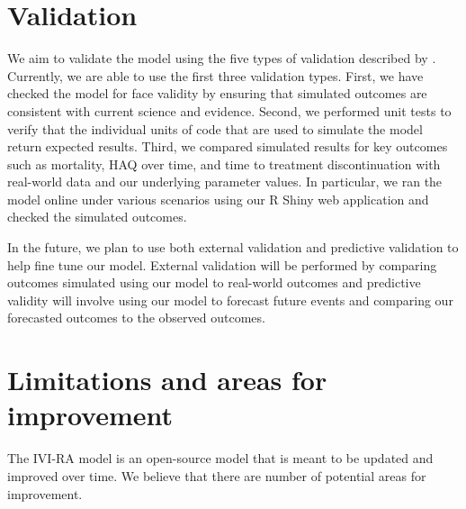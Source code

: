 \documentclass[11pt,final,fleqn]{article}\usepackage[]{graphicx}\usepackage[]{color}
\theoremstyle{plain}
\begin{document}
\section{Validation}\label{sec:validation}
We aim to validate the model using the five types of validation described by \citet{eddy2012model}. Currently, we are able to use the first three validation types. First, we have checked the model for face validity by ensuring that simulated outcomes are consistent with current science and evidence. Second, we performed unit tests to verify that the individual units of code that are used to simulate the model return expected results. Third, we compared simulated results for key outcomes such as mortality, HAQ over time, and time to treatment discontinuation with real-world data and our underlying parameter values. In particular, we ran the model online under various scenarios using our R Shiny web application and checked the simulated outcomes. 

In the future, we plan to use both external validation and predictive validation to help fine tune our model. External validation will be performed by comparing outcomes simulated using our model to real-world outcomes and predictive validity will involve using our model to forecast future events and comparing our forecasted outcomes to the observed outcomes. 

\section{Limitations and areas for improvement}\label{sec:limitations}
The IVI-RA model is an open-source model that is meant to be updated and improved over time. We believe that there are number of potential areas for improvement.
\end{document}
